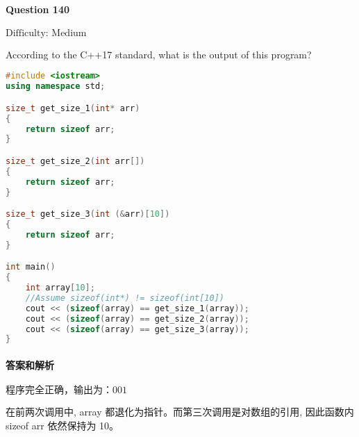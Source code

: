 \documentclass{article}
\begin{document}
	\paragraph*{Question 140}\noindent $\boxed{\text{Difficulty: Medium}} $
	
	According to the C++17 standard, what is the output of this program? 
	
	\begin{lstlisting}[language=C++]    
#include <iostream>
using namespace std;

size_t get_size_1(int* arr)
{
	return sizeof arr;
}

size_t get_size_2(int arr[])
{
	return sizeof arr;
}

size_t get_size_3(int (&arr)[10])
{
	return sizeof arr;
}

int main()
{
	int array[10];
	//Assume sizeof(int*) != sizeof(int[10])
	cout << (sizeof(array) == get_size_1(array));
	cout << (sizeof(array) == get_size_2(array));
	cout << (sizeof(array) == get_size_3(array));
}
	\end{lstlisting}
	
	\paragraph*{答案和解析} $\boxed{\text{程序完全正确，输出为：001}} $
		
	在前两次调用中, array 都退化为指针。而第三次调用是对数组的引用, 因此函数内 sizeof arr 依然保持为 10。
	
\end{document}
